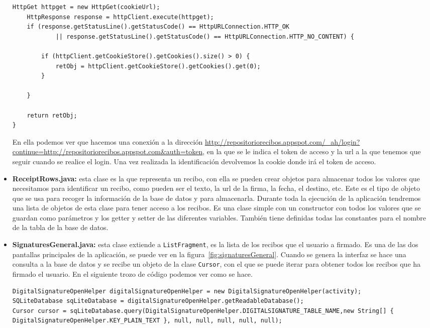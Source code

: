 \begin{itemize}
\begin{lstlisting}[style=Java]
	HttpGet httpget = new HttpGet(cookieUrl);
	HttpResponse response = httpClient.execute(httpget);
	if (response.getStatusLine().getStatusCode() == HttpURLConnection.HTTP_OK
			|| response.getStatusLine().getStatusCode() == HttpURLConnection.HTTP_NO_CONTENT) {

		if (httpClient.getCookieStore().getCookies().size() > 0) {
			retObj = httpClient.getCookieStore().getCookies().get(0);
		}

	}

	return retObj;
}
\end{lstlisting} 

En ella podemos ver que hacemos una conexión a la dirección \url{http://repositoriorecibos.appspot.com/\_ah/login?continue=http://repositoriorecibos.appspot.com&auth=token}, en la que se le indica el token de acceso y la url a la que tenemos que seguir cuando se realice el login. Una vez realizada la identificación devolvemos la cookie donde irá el token de acceso.

\item \textbf{ReceiptRows.java:} esta clase es la que representa un recibo, con ella se pueden crear objetos para almacenar todos los valores que necesitamos para identificar un recibo, como pueden ser el texto, la url de la firma, la fecha, el destino, etc. Este es el tipo de objeto que se usa para recoger la información de la base de datos y para almacenarla. Durante toda la ejecución de la aplicación tendremos una lista de objetos de esta clase para tener acceso a los recibos. Es una clase simple con un constructor con todos los valores que se guardan como parámetros y los getter y setter de las diferentes variables. También tiene definidas todas las constantes para el nombre de la tabla de la base de datos.

\item \textbf{SignaturesGeneral.java:} esta clase extiende a \lstinline{ListFragment}, es la lista de los recibos que el usuario a firmado. Es una de las dos pantallas principales de la aplicación, se puede ver en la figura~\ref{fig:signaturesGeneral}. Cuando se genera la interfaz se hace una consulta a la base de datos y se recibe un objeto de la clase \lstinline{Cursor}, con el que se puede iterar para obtener todos los recibos que ha firmado el usuario. En el siguiente trozo de código podemos ver como se hace.

\begin{lstlisting}[style=Java]
DigitalSignatureOpenHelper digitalSignatureOpenHelper = new DigitalSignatureOpenHelper(activity);
SQLiteDatabase sqLiteDatabase = digitalSignatureOpenHelper.getReadableDatabase();
Cursor cursor = sqLiteDatabase.query(DigitalSignatureOpenHelper.DIGITALSIGNATURE_TABLE_NAME,new String[] { DigitalSignatureOpenHelper.KEY_PLAIN_TEXT }, null, null, null, null, null);
\end{lstlisting} 


\end{itemize}
